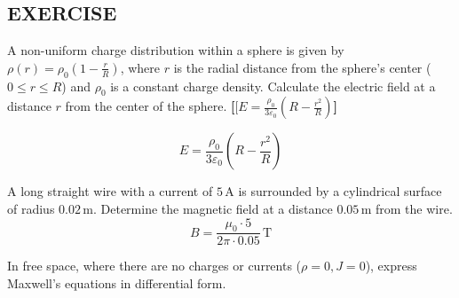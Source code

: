 \begin{mdframed}[backgroundcolor=lightblue, linewidth=1pt, hidealllines=true]
	\section{EXERCISE}
	
	\begin{ExerciseList}
		\Exercise[label={ex1}] A non-uniform charge distribution within a sphere is given by $\rho(r) = \rho_0 \left(1 - \frac{r}{R}\right)$, where $r$ is the radial distance from the sphere's center ($0 \leq r \leq R$) and $\rho_0$ is a constant charge density. Calculate the electric field at a distance $r$ from the center of the sphere.
		\hfill\textbf{[$[E = \frac{\rho_0}{3\varepsilon_0}\left(R - \frac{r^2}{R}\right)$]}
		
		
		
		\Answer[ref={ex1}]
		\[E = \frac{\rho_0}{3\varepsilon_0}\left(R - \frac{r^2}{R}\right)\]
		
		\Exercise[label={ex2}] A long straight wire with a current of $5 \, \text{A}$ is surrounded by a cylindrical surface of radius $0.02 \, \text{m}$. Determine the magnetic field at a distance $0.05 \, \text{m}$ from the wire.
		\Answer[ref={ex1}]
		\[B = \frac{\mu_0 \cdot 5}{2\pi \cdot 0.05} \, \text{T}\]
		
		\Exercise[label={ex3}] In free space, where there are no charges or currents ($\rho = 0, J = 0$), express Maxwell's equations in differential form.
		
		

\end{ExerciseList}
\end{mdframed}
